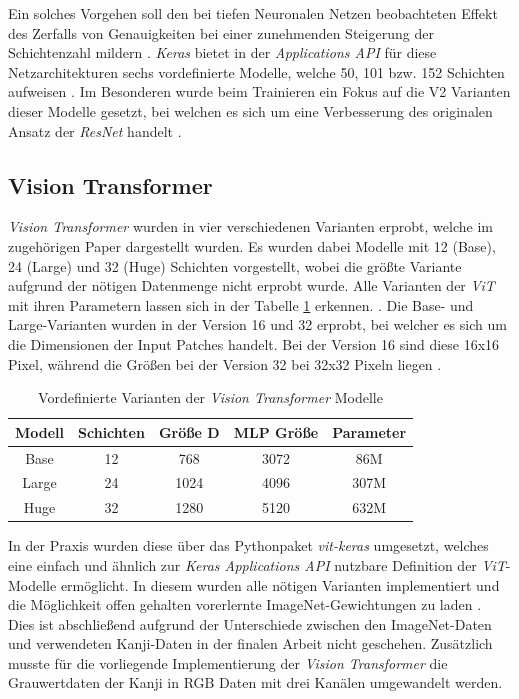 \documentclass[twoside,a4paper]{IEEEtran}
\begin{document}
Ein solches Vorgehen soll den bei tiefen Neuronalen Netzen beobachteten Effekt des Zerfalls von Genauigkeiten bei einer zunehmenden Steigerung der Schichtenzahl mildern \cite[S.1]{resnet}. \emph{Keras} bietet in der \emph{Applications API} für diese Netzarchitekturen sechs vordefinierte Modelle, welche 50, 101 bzw. 152 Schichten aufweisen \cite{resnet_keras}. Im Besonderen wurde beim Trainieren ein Fokus auf die V2 Varianten dieser Modelle gesetzt, bei welchen es sich um eine Verbesserung des originalen Ansatz der \emph{ResNet} handelt \cite{resnetv2}.
\subsection{Vision Transformer} %
\emph{Vision Transformer} wurden in vier verschiedenen Varianten erprobt, welche im zugehörigen Paper dargestellt wurden. Es wurden dabei Modelle mit 12 (Base), 24 (Large) und 32 (Huge) Schichten vorgestellt, wobei die größte Variante aufgrund der nötigen Datenmenge nicht erprobt wurde. Alle Varianten der \emph{ViT} mit ihren Parametern lassen sich in der Tabelle \ref{vit_sizes} erkennen. \cite[S.5]{VIT}. Die Base- und Large-Varianten wurden in der Version 16 und 32 erprobt, bei welcher es sich um die Dimensionen der Input Patches handelt. Bei der Version 16 sind diese 16x16 Pixel, während die Größen bei der Version 32 bei 32x32 Pixeln liegen \cite[S.5]{VIT}. 
\begin{table}[!htb]
	\caption{Vordefinierte Varianten der \emph{Vision Transformer} Modelle \cite[S.5]{VIT}}
	\label{vit_sizes}
	\centering
	\begin{tabular}{|c|c|c|c|c|}
		\hline
		Modell & Schichten & Größe D & MLP Größe & Parameter\\
		\hline
		\hline
		Base & 12 & 768 & 3072 & 86M\\
		\hline
		Large & 24 & 1024 & 4096 & 307M\\
		\hline
		Huge & 32 & 1280 & 5120 & 632M\\
		\hline 
	\end{tabular}
\end{table}

In der Praxis wurden diese über das Pythonpaket \emph{vit-keras} umgesetzt, welches eine einfach und ähnlich zur \emph{Keras Applications API} nutzbare Definition der \emph{ViT}-Modelle ermöglicht. In diesem wurden alle nötigen Varianten implementiert und die Möglichkeit offen gehalten vorerlernte ImageNet-Gewichtungen zu laden \cite{git_vit}. Dies ist abschließend aufgrund der Unterschiede zwischen den ImageNet-Daten und verwendeten Kanji-Daten in der finalen Arbeit nicht geschehen. Zusätzlich musste für die vorliegende Implementierung der \emph{Vision Transformer} die Grauwertdaten der Kanji in RGB Daten mit drei Kanälen umgewandelt werden. 
\end{document}
